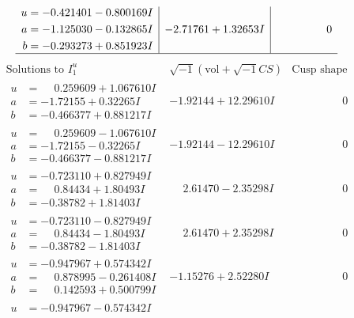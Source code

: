 \documentclass[1p]{elsarticle_modified}
\theoremstyle{definition}
\newcommand{\I}{\sqrt{-1}}
\begin{document}
$$\begin{array}{c|c|c}
\begin{aligned}
u &= -0.421401 - 0.800169 I \\
a &= -1.125030 - 0.132865 I \\
b &= -0.293273 + 0.851923 I\end{aligned}
 & -2.71761 + 1.32653 I & \phantom{-0.000000 } 0\\
 \hline 
 \end{array}$$\newpage$$\begin{array}{c|c|c}  
\text{Solutions to }I^u_{1}& \I (\text{vol} + \sqrt{-1}CS) & \text{Cusp shape}\\
 \hline 
\begin{aligned}
u &= \phantom{-}0.259609 + 1.067610 I \\
a &= -1.72155 + 0.32265 I \\
b &= -0.466377 + 0.881217 I\end{aligned}
 & -1.92144 + 12.29610 I & \phantom{-0.000000 } 0 \\ \hline\begin{aligned}
u &= \phantom{-}0.259609 - 1.067610 I \\
a &= -1.72155 - 0.32265 I \\
b &= -0.466377 - 0.881217 I\end{aligned}
 & -1.92144 - 12.29610 I & \phantom{-0.000000 } 0 \\ \hline\begin{aligned}
u &= -0.723110 + 0.827949 I \\
a &= \phantom{-}0.84434 + 1.80493 I \\
b &= -0.38782 + 1.81403 I\end{aligned}
 & \phantom{-}2.61470 - 2.35298 I & \phantom{-0.000000 } 0 \\ \hline\begin{aligned}
u &= -0.723110 - 0.827949 I \\
a &= \phantom{-}0.84434 - 1.80493 I \\
b &= -0.38782 - 1.81403 I\end{aligned}
 & \phantom{-}2.61470 + 2.35298 I & \phantom{-0.000000 } 0 \\ \hline\begin{aligned}
u &= -0.947967 + 0.574342 I \\
a &= \phantom{-}0.878995 - 0.261408 I \\
b &= \phantom{-}0.142593 + 0.500799 I\end{aligned}
 & -1.15276 + 2.52280 I & \phantom{-0.000000 } 0 \\ \hline\begin{aligned}
u &= -0.947967 - 0.574342 I \\

\end{aligned}
\end{array}$$
\end{document}

